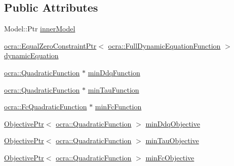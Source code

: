 \subsection*{Public Attributes}
\begin{DoxyCompactItemize}
\item 
Model\+::\+Ptr \hyperlink{structocra_1_1CascadeQPSolver_1_1StandardObjectivesAndConstraints_afef3efb83bcd601ec3fb552baf7c5a22}{inner\+Model}
\item 
\hyperlink{classocra_1_1EqualZeroConstraintPtr}{ocra\+::\+Equal\+Zero\+Constraint\+Ptr}$<$ \hyperlink{classocra_1_1FullDynamicEquationFunction}{ocra\+::\+Full\+Dynamic\+Equation\+Function} $>$ \hyperlink{structocra_1_1CascadeQPSolver_1_1StandardObjectivesAndConstraints_a31b476355775f3c5ec5caf75722325b4}{dynamic\+Equation}
\item 
\hyperlink{classocra_1_1QuadraticFunction}{ocra\+::\+Quadratic\+Function} $\ast$ \hyperlink{structocra_1_1CascadeQPSolver_1_1StandardObjectivesAndConstraints_aecb4a6afb7cc5eb348017a0cfdf9e0ca}{min\+Ddq\+Function}
\item 
\hyperlink{classocra_1_1QuadraticFunction}{ocra\+::\+Quadratic\+Function} $\ast$ \hyperlink{structocra_1_1CascadeQPSolver_1_1StandardObjectivesAndConstraints_a1268aaa4e0f1eb462eb04d6634f1b110}{min\+Tau\+Function}
\item 
\hyperlink{classocra_1_1FcQuadraticFunction}{ocra\+::\+Fc\+Quadratic\+Function} $\ast$ \hyperlink{structocra_1_1CascadeQPSolver_1_1StandardObjectivesAndConstraints_aeb55f736a7826cf39bda57eff7114275}{min\+Fc\+Function}
\item 
\hyperlink{classocra_1_1ObjectivePtr}{Objective\+Ptr}$<$ \hyperlink{classocra_1_1QuadraticFunction}{ocra\+::\+Quadratic\+Function} $>$ \hyperlink{structocra_1_1CascadeQPSolver_1_1StandardObjectivesAndConstraints_a6fd5e2332a618501b07ed6c4265b1fb7}{min\+Ddq\+Objective}
\item 
\hyperlink{classocra_1_1ObjectivePtr}{Objective\+Ptr}$<$ \hyperlink{classocra_1_1QuadraticFunction}{ocra\+::\+Quadratic\+Function} $>$ \hyperlink{structocra_1_1CascadeQPSolver_1_1StandardObjectivesAndConstraints_a3abba9256a6fbbd58d1f8f54ce63da4e}{min\+Tau\+Objective}
\item 
\hyperlink{classocra_1_1ObjectivePtr}{Objective\+Ptr}$<$ \hyperlink{classocra_1_1QuadraticFunction}{ocra\+::\+Quadratic\+Function} $>$ \hyperlink{structocra_1_1CascadeQPSolver_1_1StandardObjectivesAndConstraints_a81fe424070d5b919b083044a4ea7a473}{min\+Fc\+Objective}
\end{DoxyCompactItemize}


